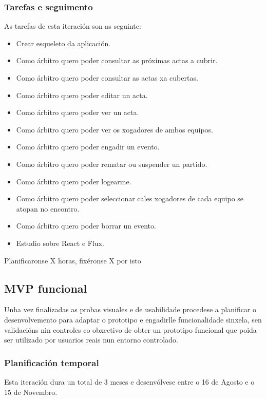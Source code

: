       \subsubsection{Tarefas e seguimento}

      As tarefas de esta iteración son as seguinte:

      \begin{itemize}
        \item Crear esqueleto da aplicación.
        \item Como árbitro quero poder consultar as próximas actas a 
cubrir.
        \item Como árbitro quero poder consultar as actas xa cubertas.
        \item Como árbitro quero poder editar un acta.
        \item Como árbitro quero poder ver un acta.
        \item Como árbitro quero poder ver os xogadores de ambos equipos.
        \item Como árbitro quero poder engadir un evento.
        \item Como árbitro quero poder rematar ou suspender un partido.
        \item Como árbitro quero poder logearme.
        \item Como árbitro quero poder seleccionar cales xogadores de cada 
equipo se atopan no encontro.
        \item Como árbitro quero poder borrar un evento.
        \item Estudio sobre React e Flux.
       \end{itemize}

      Planificaronse X horas, fixéronse X por isto

    \subsection{MVP funcional}
    Unha vez finalizadas as probas visuales e de usabilidade procedese 
a planificar o desenvolvemento para adaptar o prototipo e engadirlle 
funcionalidade sinxela, sen validacións nin controles co obxectivo de obter un 
prototipo funcional que poida ser utilizado por usuarios reais nun entorno 
controlado.

      \subsubsection{Planificación temporal}
      Esta iteración dura un total de 3 meses e desenvólvese entre o 16 de 
Agosto e o 15 de Novembro.

